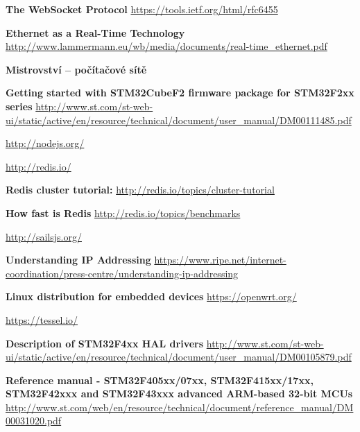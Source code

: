 \documentclass[oneside,12pt,a4paper,final]{book} %
\begin{document}
\begin{thebibliography}{99}
 {\bf The WebSocket Protocol} \url{https://tools.ietf.org/html/rfc6455}

 {\bf Ethernet as a Real-Time Technology} \url{http://www.lammermann.eu/wb/media/documents/real-time_ethernet.pdf}

 {\bf Mistrovství – počítačové sítě}

 {\bf Getting started with STM32CubeF2 firmware package for STM32F2xx series} \url{http://www.st.com/st-web-ui/static/active/en/resource/technical/document/user_manual/DM00111485.pdf}

 \url{http://nodejs.org/}

 \url{http://redis.io/}

 {\bf Redis cluster tutorial:} \url{http://redis.io/topics/cluster-tutorial}

 {\bf How fast is Redis} \url{http://redis.io/topics/benchmarks}

 \url{http://sailsjs.org/}

 {\bf Understanding IP Addressing} \url{https://www.ripe.net/internet-coordination/press-centre/understanding-ip-addressing}

 {\bf Linux distribution for embedded devices} \url{https://openwrt.org/}

 \url{https://tessel.io/}

 {\bf Description of STM32F4xx HAL drivers} \url{http://www.st.com/st-web-ui/static/active/en/resource/technical/document/user_manual/DM00105879.pdf}

 {\bf Reference manual - STM32F405xx/07xx, STM32F415xx/17xx, STM32F42xxx and
STM32F43xxx advanced ARM\textregistered-based 32-bit MCUs} \url{http://www.st.com/web/en/resource/technical/document/reference_manual/DM00031020.pdf}
\end{thebibliography}
\end{document}
